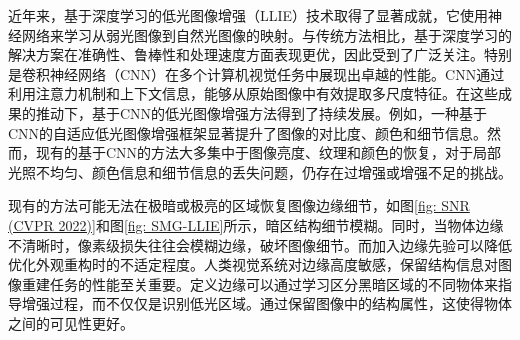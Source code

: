 \documentclass[a4paper, 10pt]{article}
\begin{document}
	近年来，基于深度学习的低光图像增强（LLIE）技术取得了显著成就，它使用神经网络来学习从弱光图像到自然光图像的映射。与传统方法相比，基于深度学习的解决方案在准确性、鲁棒性和处理速度方面表现更优，因此受到了广泛关注。特别是卷积神经网络（CNN）在多个计算机视觉任务中展现出卓越的性能。CNN通过利用注意力机制和\cite{yang2021locally, zhang2020attention}上下文信息，能够从原始图像中有效提取多尺度特征\cite{li2018multi, zamir2020learning}。在这些成果的推动下，基于CNN的低光图像增强方法得到了持续发展。例如，一种基于CNN的自适应低光图像增强框架\cite{li2020visual}显著提升了图像的对比度、颜色和细节信息。然而，现有的基于CNN的方法大多集中于图像亮度、纹理和颜色的恢复，对于局部光照不均匀、颜色信息和细节信息的丢失问题，仍存在过增强或增强不足的挑战。
	
	现有的方法可能无法在极暗或极亮的区域恢复图像边缘细节\cite{xu2023low}，如图\ref{fig: SNR (CVPR 2022)}和图\ref{fig: SMG-LLIE}所示，暗区结构细节模糊。同时，当物体边缘不清晰时，像素级损失往往会模糊边缘，破坏图像细节。而加入边缘先验可以降低优化外观重构时的不适定程度。人类视觉系统对边缘高度敏感，保留结构信息对图像重建任务的性能至关重要。定义边缘可以通过学习区分黑暗区域的不同物体来指导增强过程，而不仅仅是识别低光区域。通过保留图像中的结构属性，这使得物体之间的可见性更好。
	
\end{document}
